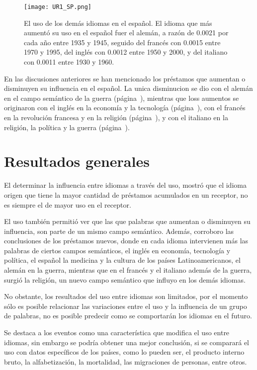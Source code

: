 		
\begin{figure}[h!] %
	\centering
	\texttt{[image: UR1\_SP.png]}
	\caption{El uso de los demás idiomas en el español. El idioma que más aumentó su uso en el español fuer el alemán, a razón de 0.0021 por cada año entre 1935 y 1945, seguido del francés con 0.0015 entre 1970 y 1995,  del inglés con 0.0012 entre 1950 y 2000, y del italiano con 0.0011 entre 1930 y 1960.}
	\label{fig.UR_SP}
\end{figure}


En las discusiones anteriores se han mencionado los préstamos que aumentan o disminuyen su influencia en el español. La unica disminucion se dio con el alemán en el campo semántico de la guerra (página~\pageref{GE-D}), mientras que loss aumentos se originaron con el inglés en la economía y la tecnología (página~\pageref{EN-D}),  con el francés en la revolución francesa y en la religión (página~\pageref{FR-D}),  y con el italiano en la religión, la política y la guerra (página~\pageref{IT-D}).





\section{Resultados generales} %


El determinar la influencia entre idiomas a través del uso, mostró que el idioma origen que tiene la mayor cantidad de préstamos acumulados en un receptor, no es siempre el de mayor uso en el receptor.  

El uso también permitió ver que las que palabras que aumentan o disminuyen su influencia, son parte de un mismo campo semántico. Además, corroboro las conclusiones de los préstamos nuevos, donde en cada idioma intervienen más las palabras de ciertos campos semánticos, el inglés en economía, tecnología y política,  el español la medicina y la cultura de los países Latinoamericanos, el alemán en la guerra,  mientras que en el francés y el italiano además de la guerra, surgió la religión, un nuevo campo semántico que influyo en los demás idiomas. 

No obstante, los resultados del uso entre idiomas son limitados, por el momento sólo es posible relacionar las variaciones entre el uso y la influencia de un grupo de palabras, no es posible predecir como se comportarán los idiomas en el futuro. 


Se destaca a los eventos como una característica que modifica el uso entre idiomas, sin embargo se podría obtener una mejor conclusión, si se comparará el uso con datos específicos de los países, como lo pueden ser, el producto interno bruto, la alfabetización, la mortalidad, las migraciones de personas, entre otros.

